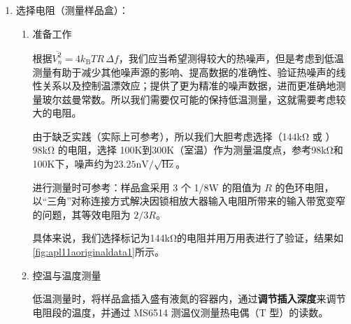 \begin{enumerate}
	\begin{ubox}{$R(t)$与时间常数和陡降有何关系？}
		在保持陡降不变的前提下，随着时间常数从 30 μs 增加到 1 ms，信号的变化幅度逐渐减小。这是因为较大的时间常数使低通滤波器的通带变窄，从而抑制了高频成分，使得输出信号对快速变化的输入信号响应变得迟缓。尽管增大时间常数可以提高输出信号的稳定性，但时间常数并非越大越好。针对不同特性的待测信号，选择合适的时间常数至关重要。只有在适当的时间常数下，系统才能在保持响应能力的同时，快速捕捉 \( R(t) \) 随时间的变化，确保信号的真实性和有效性。
		
		当保持时间常数不变，将陡降从 6 dB/oct 提高到 24 dB/oct 时，信号变化的幅度也会略微减小。陡降的增加意味着滤波器对高频噪声的抑制更为显著，但若陡降值设置过高，可能导致滤波器对输入信号的响应变得迟缓，从而影响快速变化信号的捕捉准确性。因此，合理选择陡降值非常关键，以便在有效抑制噪声的同时，确保信号的动态变化得以准确呈现。过高的陡降会降低系统对信号变化的敏感性，从而影响测量结果的准确性。
		
		总体而言，对于变化速率不同的待测信号，需要在时间常数和陡降之间找到最佳平衡，以实现最佳的信号捕捉与处理效果。
	\end{ubox}
	
	\item 选择电阻（测量样品盒）：
	\begin{enumerate}
		\item 准备工作
		
		根据$\overline {V_n^2} = 4 k_\text{B} T R \, \Delta f$，我们应当希望测得较大的热噪声，但是考虑到低温测量有助于减少其他噪声源的影响、提高数据的准确性、验证热噪声的线性关系以及控制温漂效应；提供了更为精准的噪声数据，进而更准确地测量玻尔兹曼常数。所以我们需要仅可能的保持低温测量，这就需要考虑较大的电阻。
		
		由于缺乏实践（实际上可参考\cite{c}），所以我们大胆考虑选择（144kΩ 或 ）98kΩ 的电阻，选择 100K到300K（室温）作为测量温度点，参考98kΩ和100K下，噪声约为$23.25\text{nV}/\sqrt{\text{Hz}}$。
		
		进行测量时可参考：样品盒采用 3 个 1/8W 的阻值为 $R$ 的色环电阻，以“三角”对称连接方式解决因锁相放大器输入电阻所带来的输入带宽变窄的问题，其等效电阻为 $2/3R$。
		
		\begin{ubox}{}
			具体来说，我们选择标记为144kΩ的电阻并用万用表进行了验证，结果如\cref{fig:apl11aoriginaldata1}所示。
		\end{ubox}
		
		\item 控温与温度测量
		
		低温测量时，将样品盒插入盛有液氮的容器内，通过\textbf{调节插入深度}来调节电阻段的温度，并通过 MS6514 测温仪测量热电偶（T 型）的读数。
		

\end{enumerate}
\end{enumerate}

